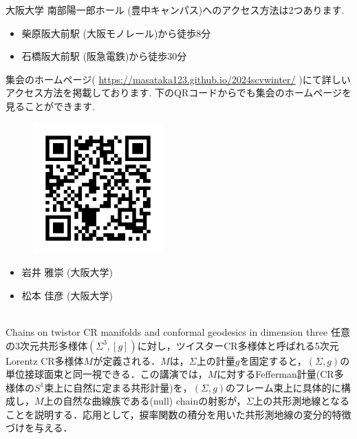 \documentclass[dvipdfmx,a4paper,12pt]{article}
\theoremstyle{plain} %
\theoremstyle{definition} %
\begin{document}
\vskip5mm

大阪大学 南部陽一郎ホール (豊中キャンパス)へのアクセス方法は2つあります.
\begin{itemize}
  \setlength{\parskip}{0cm} 
  \setlength{\itemsep}{0cm}
\item 柴原阪大前駅 (大阪モノレール)から徒歩8分
\item 石橋阪大前駅 (阪急電鉄)から徒歩30分
\end{itemize}

集会のホームページ( \url{https://masataka123.github.io/2024scvwinter/} )にて詳しいアクセス方法を掲載しております. 下のQRコードからでも集会のホームページを見ることができます. 

\begin{figure}[htbp]
\begin{center}
 \includegraphics[height=50mm, width=50mm]{2024scvwinter.png}
\end{center}
\end{figure}

  \vskip5mm
  
\begin{itemize}
  \setlength{\parskip}{0cm} 
  \setlength{\itemsep}{0cm}
\item 岩井 雅崇 (大阪大学)
\item 松本 佳彦 (大阪大学)
  \end{itemize}


\newpage

\vskip5mm

\vskip5mm
\\
Chains on twistor CR manifolds and conformal geodesics in dimension three 
\vskip3mm
任意の3次元共形多様体$(\Sigma^3, [g])$に対し，ツイスターCR多様体と呼ばれる5次元Lorentz CR多様体$M$が定義される．$M$は，$\Sigma$上の計量$g$を固定すると，$(\Sigma, g)$の単位接球面束と同一視できる．この講演では，$M$に対するFefferman計量(CR多様体の$S^1$束上に自然に定まる共形計量)を，$(\Sigma, g)$のフレーム束上に具体的に構成し，$M$上の自然な曲線族である(null) chainの射影が，$\Sigma$上の共形測地線となることを説明する．応用として，捩率関数の積分を用いた共形測地線の変分的特徴づけを与える． 
\vskip8mm
\end{document}
